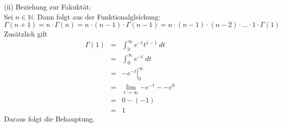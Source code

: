 \documentclass[11pt,a4paper,ngerman]{article}
\begin{document}
\begin{enumerate}[(i)]
        (ii) Beziehung zur Fakuktät: \\
        
        Sei $n \in \mathbb{N}$. Dann folgt aus der Funktionalgleichung:
        $$
          \Gamma(n+1) = n \cdot \Gamma(n) = n \cdot (n-1) \cdot \Gamma(n-1)
        =  n \cdot (n-1) \cdot (n-2) \cdot \ldots \cdot 1 \cdot \Gamma(1)
        $$
        Zusätzlich gilt
        \begin{eqnarray*}
        \Gamma(1) &=& \int_{0}^{\infty}{e^{-t} t^{1-1} \; dt} \\
        &=& \int_{0}^{\infty}{e^{-t} \; dt} \\
        &=& \left. -e^{-t} \right|_{0}^{\infty} \\
        &=& \lim_{t \to \infty}{-e^{-t}} - -e^0 \\
        &=& 0 - (-1) \\
        &=& 1
        \end{eqnarray*}
        Daraus folgt die Behauptung.
\end{enumerate}

\label{LastPage}
\end{document}
